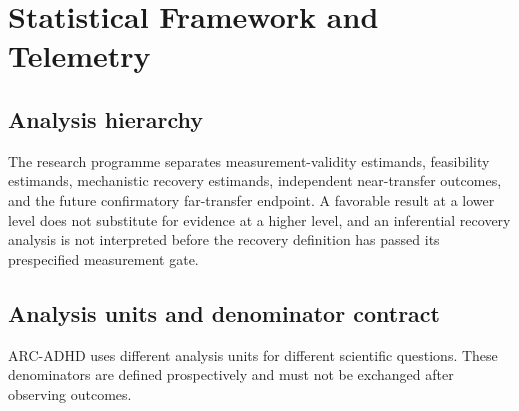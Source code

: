 \section{Statistical Framework and Telemetry}

\subsection{Analysis hierarchy}

The research programme separates measurement-validity estimands, feasibility estimands, mechanistic recovery estimands, independent near-transfer outcomes, and the future confirmatory far-transfer endpoint. A favorable result at a lower level does not substitute for evidence at a higher level, and an inferential recovery analysis is not interpreted before the recovery definition has passed its prespecified measurement gate.

\subsection{Analysis units and denominator contract}

ARC-ADHD uses different analysis units for different scientific questions. These denominators are defined prospectively and must not be exchanged after observing outcomes.


